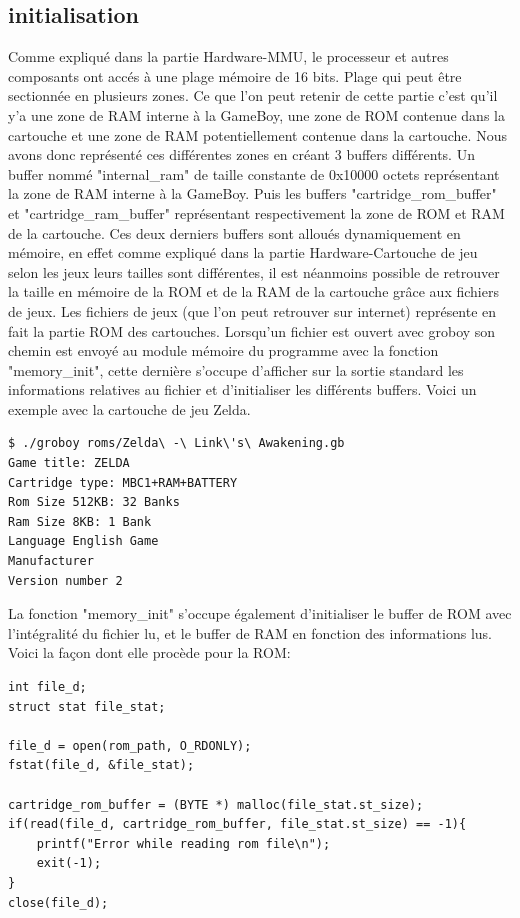 \documentclass{report}
\begin{document}
\subsection{initialisation} 
Comme expliqué dans la partie Hardware-MMU, le processeur et autres composants ont accés à une plage mémoire de 16 bits. Plage qui peut être sectionnée en plusieurs zones. Ce que l'on peut retenir de cette partie c'est qu'il y'a une zone de RAM interne à la GameBoy, une zone de ROM contenue dans la cartouche et une zone de RAM potentiellement contenue dans la cartouche. Nous avons donc représenté ces différentes zones en créant 3 buffers différents. Un buffer nommé "internal\_ram" de taille constante de 0x10000 octets représentant la zone de RAM interne à la GameBoy. Puis les buffers "cartridge\_rom\_buffer" et "cartridge\_ram\_buffer" représentant respectivement la zone de ROM et RAM de la cartouche.
Ces deux derniers buffers sont alloués dynamiquement en mémoire, en effet comme expliqué dans la partie Hardware-Cartouche de jeu selon les jeux leurs tailles sont différentes, il est néanmoins possible de retrouver la taille en mémoire de la ROM et de la RAM de la cartouche grâce aux fichiers de jeux.
Les fichiers de jeux (que l'on peut retrouver sur internet) représente en fait la partie ROM des cartouches.
Lorsqu'un fichier est ouvert avec groboy son chemin est envoyé au module mémoire du programme avec la fonction "memory\_init", cette dernière s'occupe d'afficher sur la sortie standard les informations relatives au fichier et d'initialiser les différents buffers. Voici un exemple avec la cartouche de jeu Zelda.
\begin{lstlisting}
$ ./groboy roms/Zelda\ -\ Link\'s\ Awakening.gb
Game title: ZELDA
Cartridge type: MBC1+RAM+BATTERY
Rom Size 512KB: 32 Banks
Ram Size 8KB: 1 Bank
Language English Game
Manufacturer
Version number 2
\end{lstlisting}
La fonction "memory\_init" s'occupe également d'initialiser le buffer de ROM avec l'intégralité du fichier lu, et le buffer de RAM en fonction des informations lus.
Voici la façon dont elle procède pour la ROM:
\begin{lstlisting}
int file_d;
struct stat file_stat;

file_d = open(rom_path, O_RDONLY);
fstat(file_d, &file_stat);

cartridge_rom_buffer = (BYTE *) malloc(file_stat.st_size);
if(read(file_d, cartridge_rom_buffer, file_stat.st_size) == -1){
	printf("Error while reading rom file\n");
	exit(-1);
}    
close(file_d);
\end{lstlisting}
\end{document}
